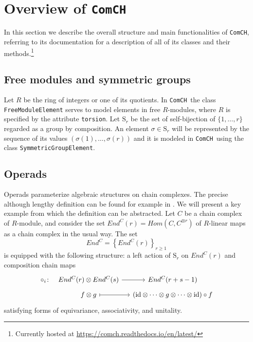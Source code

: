\documentclass{amsart}
\renewcommand{\S}{\mathrm S}
\newcommand{\comch}{\texttt{ComCH}}
\newcommand{\id}{\mathrm{id}}
\begin{document}
\tableofcontents

\section{Overview of \comch} \label{s: overview}
In this section we describe the overall structure and main functionalities of \comch, referring to its documentation for a description of all of its classes and their methods.\footnote{Currently hosted at \url{https://comch.readthedocs.io/en/latest/}}

\subsection{Free modules and symmetric groups}

Let $R$ be the ring of integers or one of its quotients. In \comch\, the class \texttt{FreeModuleElement} serves to model elements in free $R$-modules, where $R$ is specified by the attribute \texttt{torsion}. Let $\S_r$ be the set of self-bijection of $\{1, \dots, r\}$ regarded as a group by composition. An element $\sigma \in \S_r$ will be represented by the sequence of its values $(\sigma(1), \dots, \sigma(r))$ and it is modeled in \comch\, using the class \texttt{SymmetricGroupElement}.

\subsection{Operads}

Operads parameterize algebraic structures on chain complexes. The precise although lengthy definition can be found for example in \cite{Markl08}. We will present a key example from which the definition can be abstracted. Let $C$ be a chain complex of $R$-module, and consider the set $End^C(r) = Hom(C, C^{\otimes r})$ of $R$-linear maps as a chain complex in the usual way. The set 
\begin{equation*}
End^C = \left\{End^C(r)\right\}_{r \geq 1}
\end{equation*}
is equipped with the following structure: a left action of $\S_r$ on $End^C(r)$ and composition chain maps
\begin{equation*}
\begin{tikzcd}[column sep=small, row sep=tiny]
\circ_i \colon &[-10pt] End^C(r) \otimes End^C(s) \arrow[r] & End^C(r+s-1) \\
& f \otimes g \arrow[r, |->] & (\id \otimes \cdots \otimes g \otimes \cdots \otimes \id) \circ f 
\end{tikzcd}
\end{equation*}
satisfying forms of equivariance, associativity, and unitality.
\end{document}
